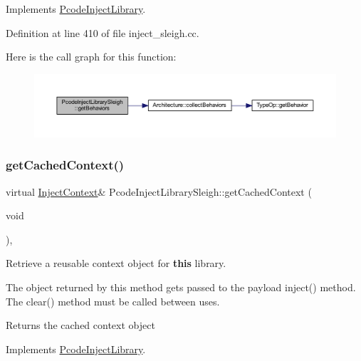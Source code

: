 Implements \mbox{\hyperlink{class_pcode_inject_library_aa2c520dab5db72d968e383b56d1ea8f6}{Pcode\+Inject\+Library}}.



Definition at line 410 of file inject\+\_\+sleigh.\+cc.

Here is the call graph for this function\+:
\nopagebreak
\begin{figure}[H]
\begin{center}
\leavevmode
\includegraphics[width=350pt]{class_pcode_inject_library_sleigh_a878ef6bdf58bd19fa82318248836b3d8_cgraph}
\end{center}
\end{figure}
\mbox{\label{class_pcode_inject_library_sleigh_a37471f5a78e16c84fc26cfaff1a7434b}} 
\subsubsection{\texorpdfstring{getCachedContext()}{getCachedContext()}}
{\footnotesize\ttfamily virtual \mbox{\hyperlink{class_inject_context}{Inject\+Context}}\& Pcode\+Inject\+Library\+Sleigh\+::get\+Cached\+Context (\begin{DoxyParamCaption}\item[{void}]{ }\end{DoxyParamCaption})\hspace{0.3cm}{\ttfamily [inline]}, {\ttfamily [virtual]}}



Retrieve a reusable context object for {\bfseries{this}} library. 

The object returned by this method gets passed to the payload inject() method. The clear() method must be called between uses. \begin{DoxyReturn}{Returns}
the cached context object 
\end{DoxyReturn}


Implements \mbox{\hyperlink{class_pcode_inject_library_a3a1ca9f7ea2cea02de1141cc35c79b18}{Pcode\+Inject\+Library}}.



